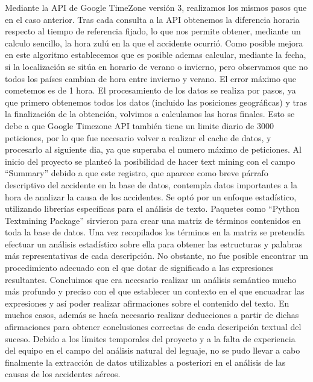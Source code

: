 \documentclass[a4paper,10pt]{article}
\begin{document}
\singlespacing
Mediante la API de Google TimeZone versi\'on 3, realizamos los mismos pasos que en el caso anterior. Tras cada consulta a la API obtenemos la diferencia horaria respecto al tiempo de referencia fijado, lo que nos permite obtener, mediante un calculo sencillo, la hora zul\'u en la que el accidente ocurri\'o. Como posible mejora en este algoritmo establecemos que es posible ademas calcular, mediante la fecha, si la localizaci\'on se sit\'ua en horario de verano o invierno, pero observamos que no todos los pa\'ises cambian de hora entre invierno y verano. El error m\'aximo que cometemos es de 1 hora.
\singlespacing
El procesamiento de los datos se realiza por pasos, ya que primero obtenemos todos los datos (incluido las posiciones geogr\'aficas) y tras la finalizaci\'on de la obtenci\'on, volvimos a calculamos las horas finales. Esto se debe a que Google Timezone API tambi\'en tiene un limite diario de 3000 peticiones, por lo que fue necesario volver a realizar el cache de datos, y procesarlo al siguiente dia, ya que superaba el numero m\'aximo de peticiones.
\singlespacing
Al inicio del proyecto se plante\'o la posibilidad de hacer text mining con el campo ``Summary'' debido a que este registro, que aparece como breve p\'arrafo descriptivo del accidente en la base de datos, contempla datos importantes a la hora de analizar la causa de los accidentes.
\singlespacing
Se opt\'o por un enfoque estad\'istico, utilizando librer\'ias espec\'ificas para el an\'alisis de texto. Paquetes como ``Python Textmining Package'' sirvieron para crear una matriz de t\'erminos contenidos en toda la base de datos. Una vez recopilados los t\'erminos en la matriz se pretend\'ia efectuar un an\'alisis estad\'istico sobre ella para obtener las estructuras y palabras m\'as representativas de cada descripci\'on.
\singlespacing
No obstante, no fue posible encontrar un procedimiento adecuado con el que dotar de significado a las expresiones resultantes. Concluimos que era necesario realizar un an\'alisis sem\'antico mucho m\'as profundo y preciso con el que establecer un contexto en el que encuadrar las expresiones y as\'i poder realizar afirmaciones sobre el contenido del texto. En muchos casos, adem\'as se hac\'ia necesario realizar deducciones a partir de dichas  afirmaciones para obtener conclusiones correctas de cada descripci\'on textual del suceso.
\singlespacing
Debido a los l\'imites temporales del proyecto y a la falta de experiencia del equipo en el campo del an\'alisis natural del leguaje, no se pudo llevar a cabo finalmente la extracci\'on de datos utilizables a posteriori en el an\'alisis de las causas de los accidentes a\'ereos.
\pagebreak
\end{document}
